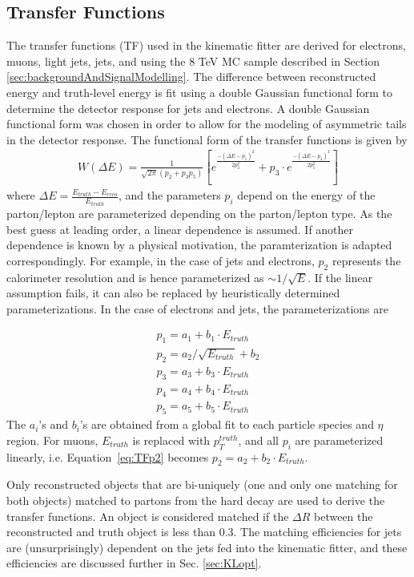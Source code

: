 \subsection{Transfer Functions}
\label{sec:TF}
The transfer functions (TF) used in the kinematic fitter are derived for electrons, muons, light jets, \bt jets, and \met using the 8 TeV \ttbar MC sample described in Section \ref{sec:backgroundAndSignalModelling}. The difference between reconstructed energy and truth-level energy is fit using a double Gaussian functional form to determine the detector response for jets and electrons. A double Gaussian functional form was chosen in order to allow for the modeling of asymmetric tails in the detector response. The functional form of the transfer functions is given by
\begin{eqnarray}
W(\Delta E)=\frac{1}{\sqrt{2\pi}(p_2+p_3p_5)}\left[ e^{\frac{-(\Delta E-p_1)^2}{2p_2^2}}+p_3\cdot e^{\frac{-(\Delta E-p_4)^2}{2p_5^2}}\right]
\label{eq:TFeq}
\end{eqnarray}
where $\Delta E=\frac{E_{truth}-E_{reco}}{E_{truth}}$, and the parameters $p_i$ depend on the energy of the parton/lepton are parameterized depending on the parton/lepton type. As the best guess at leading order, a linear dependence is assumed. If another dependence is known by a physical motivation, the paramterization is adapted correspondingly. For example, in the case of jets and electrons, $p_2$ represents the calorimeter resolution and is hence parameterized as $\sim 1/\sqrt{E}$. If the linear assumption fails, it can also be replaced by heuristically determined parameterizations. In the case of electrons and jets, the parameterizations are 

\begin{eqnarray}
p_1=a_1+b_1\cdot E_{truth}\label{eq:TFp1}\\
p_2=a_2/\sqrt{E_{truth}}+b_2\label{eq:TFp2}\\
p_3=a_3+b_3\cdot E_{truth}\label{eq:TFp3}\\
p_4=a_4+b_4\cdot E_{truth}\label{eq:TFp4}\\
p_5=a_5+b_5\cdot E_{truth}\label{eq:TFp5}
\end{eqnarray}
The $a_i$'s and $b_i$'s are obtained from a global fit to each particle species and $\eta$ region. For muons, $E_{truth}$ is replaced with $p_{T}^{truth}$, and all $p_i$ are parameterized linearly, i.e. Equation~\ref{eq:TFp2} becomes $p_2=a_2+b_2\cdot E_{truth}$. 

Only reconstructed objects that are bi-uniquely (one and only one matching for both objects) matched to partons from the hard decay are used to derive the transfer functions. An object is considered matched if the $\Delta R$ between the reconstructed and truth object is less than 0.3. The matching efficiencies for jets are (unsurprisingly) dependent on the jets fed into the kinematic fitter, and these efficiencies are discussed further in Sec. \ref{sec:KLopt}.

